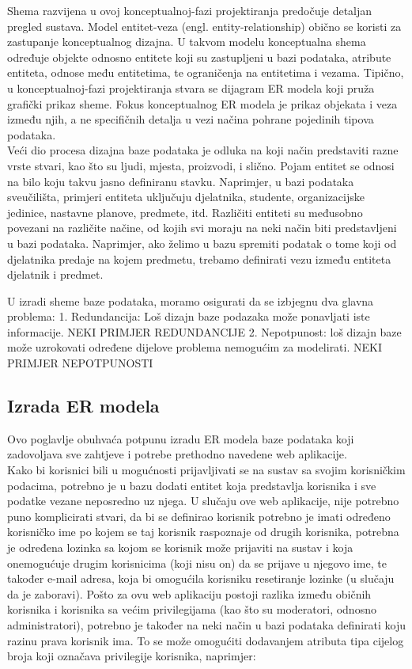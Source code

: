 \documentclass[times, utf8, zavrsni]{fer}
\begin{document}
Shema razvijena u ovoj konceptualnoj-fazi projektiranja predočuje detaljan pregled sustava. Model entitet-veza (engl. entity-relationship) obično se koristi za zastupanje konceptualnog dizajna. U takvom modelu konceptualna shema određuje objekte odnosno entitete koji su zastupljeni u bazi podataka, atribute entiteta, odnose među entitetima, te ograničenja na entitetima i vezama. Tipično, u konceptualnoj-fazi projektiranja stvara se dijagram ER modela koji pruža grafički prikaz sheme. Fokus konceptualnog ER modela je prikaz objekata i veza između njih, a ne specifičnih detalja u vezi načina pohrane pojedinih tipova podataka.\\

Veći dio procesa dizajna baze podataka je odluka na koji način predstaviti razne vrste stvari, kao što su ljudi, mjesta, proizvodi, i slično. Pojam entitet se odnosi na bilo koju takvu jasno definiranu stavku. Naprimjer, u bazi podataka sveučilišta, primjeri entiteta uključuju djelatnika, studente, organizacijske jedinice, nastavne planove, predmete, itd. Različiti entiteti su međusobno povezani na različite načine, od kojih svi moraju na neki način biti predstavljeni u bazi podataka. Naprimjer, ako želimo u bazu spremiti podatak o tome koji od djelatnika predaje na kojem predmetu, trebamo definirati vezu između entiteta djelatnik i predmet.

U izradi sheme baze podataka, moramo osigurati da se izbjegnu dva glavna problema:
1. Redundancija: Loš dizajn baze podazaka može ponavljati iste informacije.
NEKI PRIMJER REDUNDANCIJE
2. Nepotpunost: loš dizajn baze može uzrokovati određene dijelove problema nemogućim za modelirati.
NEKI PRIMJER NEPOTPUNOSTI

\subsection{Izrada ER modela}

Ovo poglavlje obuhvaća potpunu izradu ER modela baze podataka koji zadovoljava sve zahtjeve i potrebe prethodno navedene web aplikacije.\\

Kako bi korisnici bili u mogućnosti prijavljivati se na sustav sa svojim korisničkim podacima, potrebno je u bazu dodati entitet koja predstavlja korisnika i sve podatke vezane neposredno uz njega. U slučaju ove web aplikacije, nije potrebno puno komplicirati stvari, da bi se definirao korisnik potrebno je imati određeno korisničko ime po kojem se taj korisnik raspoznaje od drugih korisnika, potrebna je određena lozinka sa kojom se korisnik može prijaviti na sustav i koja onemogućuje drugim korisnicima (koji nisu on) da se prijave u njegovo ime, te također e-mail adresa, koja bi omogućila korisniku resetiranje lozinke (u slučaju da je zaboravi). Pošto za ovu web aplikaciju postoji razlika između običnih korisnika i korisnika sa većim privilegijama (kao što su moderatori, odnosno administratori), potrebno je također na neki način u bazi podataka definirati koju razinu prava korisnik ima. To se može omogućiti dodavanjem atributa tipa cijelog broja koji označava privilegije korisnika, naprimjer:\\
\end{document}
